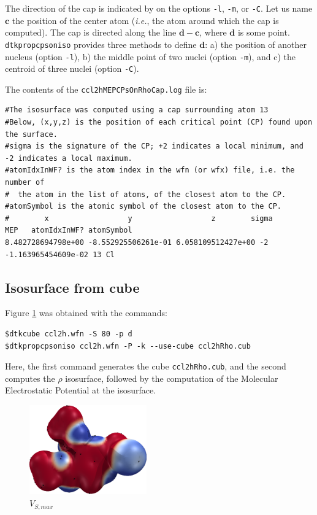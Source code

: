 The direction of the cap is indicated by on the options \texttt{-l}, \texttt{-m}, or
\texttt{-C}. Let us name $\boldsymbol c$ the position of the center atom
(\textit{i.e.}, the atom around which the cap is computed). The cap is directed along
the line $\boldsymbol d -\boldsymbol c$, where $\boldsymbol d$ is some point.
\texttt{dtkpropcpsoniso} provides three methods to define $\boldsymbol d$: a) the
position of another nucleus (option \texttt{-l}), b) the middle point of two nuclei
(option \texttt{-m}), and c) the centroid of three nuclei (option \texttt{-C}).

The contents of the \texttt{ccl2hMEPCPsOnRhoCap.log} file is:
\begin{scriptsize}
\begin{verbatim}
#The isosurface was computed using a cap surrounding atom 13
#Below, (x,y,z) is the position of each critical point (CP) found upon the surface.
#sigma is the signature of the CP; +2 indicates a local minimum, and -2 indicates a local maximum.
#atomIdxInWF? is the atom index in the wfn (or wfx) file, i.e. the number of
#  the atom in the list of atoms, of the closest atom to the CP.
#atomSymbol is the atomic symbol of the closest atom to the CP.
#        x                  y                  z        sigma       MEP   atomIdxInWF? atomSymbol
8.482728694798e+00 -8.552925506261e-01 6.058109512427e+00 -2 -1.163965454609e-02 13 Cl
\end{verbatim}
\end{scriptsize}

\subsection{Isosurface from cube}
Figure \ref{fig:vsmaxiso} was obtained with the commands:
\begin{lstlisting}
$dtkcube ccl2h.wfn -S 80 -p d
$dtkpropcpsoniso ccl2h.wfn -P -k --use-cube ccl2hRho.cub
\end{lstlisting}
Here, the first command generates the cube \texttt{ccl2hRho.cub}, and
the second computes the $\rho$ isosurface, followed by the computation
of the Molecular Electrostatic Potential at the isosurface.
%
\begin{figure}[ht!]
\centering
\includegraphics[width=0.45\textwidth]{ccl2hMEPCPsOnRhoIso}
\caption{$V_{S,max}$}\label{fig:vsmaxiso}
\end{figure}
%

